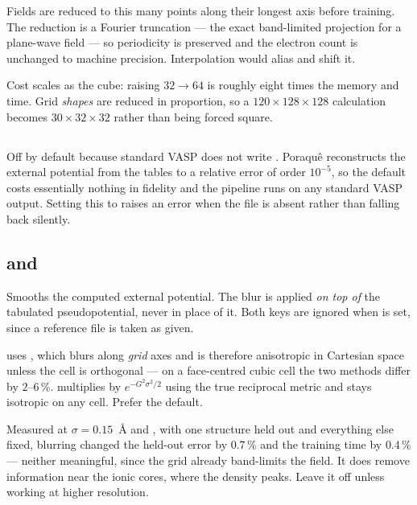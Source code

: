 Fields are reduced to this many points along their longest axis before
training. The reduction is a Fourier truncation --- the exact band-limited
projection for a plane-wave field --- so periodicity is preserved and the
electron count is unchanged to machine precision. Interpolation would alias
and shift it.

Cost scales as the cube: raising $32 \to 64$ is roughly eight times the memory
and time. Grid \emph{shapes} are reduced in proportion, so a
$120\times128\times128$ calculation becomes $30\times32\times32$ rather than
being forced square.

\subsection{}

\begin{pnote}
Off by default because standard VASP does not write . Poraqu\^e
reconstructs the external potential from the  tables to a relative
error of order $10^{-5}$, so the default costs essentially nothing in fidelity
and the pipeline runs on any standard VASP output. Setting this to 
raises an error when the file is absent rather than falling back silently.
\end{pnote}

\subsection{ and }

Smooths the computed external potential. The blur is applied \emph{on top of}
the tabulated pseudopotential, never in place of it. Both keys are ignored when
 is set, since a reference file is taken as given.

\begin{pwarn}
 uses , which blurs along
\emph{grid} axes and is therefore anisotropic in Cartesian space unless the
cell is orthogonal --- on a face-centred cubic cell the two methods differ by
$2$--$6\,\%$.  multiplies by $e^{-G^{2}\sigma^{2}/2}$ using the
true reciprocal metric and stays isotropic on any cell. Prefer the default.
\end{pwarn}

Measured at $\sigma = 0.15$~\AA{} and , with one structure
held out and everything else fixed, blurring changed the held-out error by
$0.7\,\%$ and the training time by $0.4\,\%$ --- neither meaningful, since the
grid already band-limits the field. It does remove information near the ionic
cores, where the density peaks. Leave it off unless working at higher
resolution.

